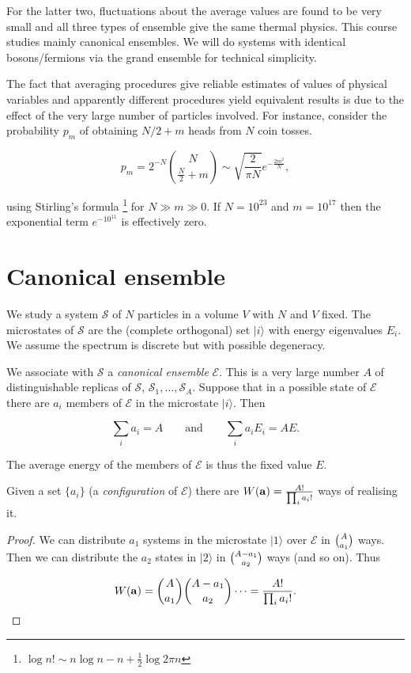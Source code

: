 \documentclass{notes}
\newcommand{\cS}{\mathcal{S}}
\newcommand{\cE}{\mathcal{E}}
\newcommand{\ket}[1]{|#1\rangle}
\begin{document}
For the latter two, fluctuations about the average values are found to
be very small and all three types of ensemble give the same thermal
physics.  This course studies mainly canonical ensembles.  We will do
systems with identical bosons/fermions via the grand ensemble for
technical simplicity.

The fact that averaging procedures give reliable estimates of values of
physical variables and apparently different procedures yield equivalent
results is due to the effect of the very large number of particles
involved.  For instance, consider the probability $p_m$ of obtaining
$N/2 + m$ heads from $N$ coin tosses.

\[
p_m = 2^{-N} \binom{N}{\tfrac{N}{2} + m}
\sim \sqrt{\frac{2}{\pi N}} e^{-\frac{2 m^2}{N}},
\]

using Stirling's formula%
\footnote{$\log n! \sim n \log n - n + \tfrac{1}{2}
\log 2 \pi n$}
for $N \gg m \gg 0$. If $N = 10^{23}$ and $m=10^{17}$ then the
exponential term $e^{-10^{11}}$ is effectively zero.

\section{Canonical ensemble}

We study a system $\cS$ of $N$ particles in a volume $V$ with $N$ and
$V$ fixed.  The microstates of $\cS$ are the (complete orthogonal)
set $\ket{i}$ with energy eigenvalues $E_i$.  We assume the spectrum
is discrete but with possible degeneracy.

We associate with $\cS$ a \emph{canonical ensemble} $\cE$.  This
is a very large number $A$ of distinguishable replicas of $\cS$,
$\cS_1, \dots, \cS_A$.  Suppose that in a possible state
of $\cE$ there are $a_i$ members of $\cE$ in the microstate $\ket{i}$.
Then

\begin{equation}\label{eq:canconst}
\sum_i a_i = A \qquad \text{and} \qquad \sum_i a_i E_i = A E.
\end{equation}

The average energy of the members of $\cE$ is thus the fixed value $E$.

Given a set $\{ a_i \}$ (a \emph{configuration} of $\cE$) there
are $W(\mathbf{a}) = \tfrac{A!}{\prod_i a_i!}$ ways of realising it.

\begin{proof}
We can distribute $a_1$ systems in the microstate $\ket{1}$ over
$\cE$ in $\tbinom{A}{a_1}$ ways.  Then we can distribute the $a_2$
states in $\ket{2}$ in $\tbinom{A-a_1}{a_2}$ ways (and so on).  Thus

\[
W(\mathbf{a}) = \binom{A}{a_1} \binom{A-a_1}{a_2} \dots
= \frac{A!}{\prod_i a_i!}.
\]
\end{proof}
\end{document}
